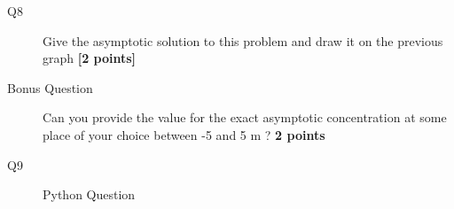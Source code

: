 \documentclass{article}
\begin{document}
\begin{description}

\item [Q8] Give the asymptotic solution to this problem and draw it on the previous graph  \textbf{[2 points]}

\item[Bonus Question] Can you provide the value for the exact asymptotic concentration at some place of your choice between -5 and 5 m ? \textbf{2 points}
\vspace{2cm}

\item[Q9] Python Question

\end{description}
\end{document}
